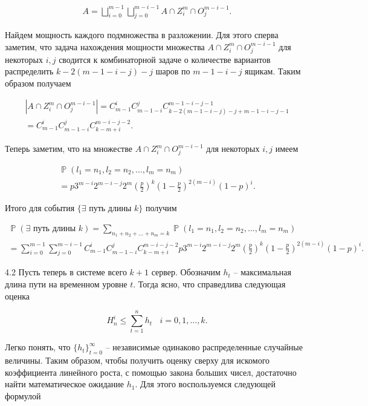 \documentclass[10pt, reqno]{amsart}
\DeclareMathOperator*{\Pb}{\mathbb{P}}
\begin{document}
  \begin{align*}
    A = \bigsqcup_{i=0}^{m-1}\bigsqcup_{j=0}^{m-i-1}A \cap Z_{i}^{m} \cap O_{j}^{m-i-1}.
  \end{align*}
  
  Найдем мощность каждого подмножества в разложении. Для этого сперва заметим, что задача нахождения мощности множества $A \cap Z_{i}^{m} \cap O_{j}^{m-i-1}$ для некоторых $i, j$ сводится к комбинаторной задаче о количестве вариантов распределить $k-2(m-1-i-j)-j$ шаров по $m-1-i-j$ ящикам. Таким образом получаем
  
  \begin{align*}
    |A \cap Z_{i}^{m} \cap O_{j}^{m-i-1}| = C_{m-1}^{i}C_{m-1-i}^{j}C_{k-2(m-1-i-j)-j+m-1-i-j-1}^{m-1-i-j-1} \\ = C_{m-1}^{i}C_{m-1-i}^{j}C_{k-m+i}^{m-i-j-2}.
  \end{align*}
  
  Теперь заметим, что на множестве $A \cap Z_{i}^{m} \cap O_{j}^{m-i-1}$ для некоторых $i, j$ имеем
  
  \begin{align*}
    \Pb(l_{1}=n_{1}, l_{2}=n_{2},..., l_{m}=n_{m}) \\ = p3^{m-i}2^{m-i-j}2^{m}(\frac{p}{2})^{k}(1-\frac{p}{2})^{2(m-i)}(1-p)^{i}.
  \end{align*}
  
  Итого для события $\{\exists \text{ путь длины } k\}$ получим
  
  \begin{align*}
    \Pb(\exists \text{ путь длины } k) = \sum_{n_{1}+n_{2}+...+n_{m} = k}\Pb(l_{1}=n_{1}, l_{2}=n_{2},..., l_{m}=n_{m}) \\ = \sum_{i=0}^{m-1}\sum_{j=0}^{m-i-1}C_{m-1}^{i}C_{m-1-i}^{j}C_{k-m+i}^{m-i-j-2}p3^{m-i}2^{m-i-j}2^{m}(\frac{p}{2})^{k}(1-\frac{p}{2})^{2(m-i)}(1-p)^{i}.
  \end{align*}
  
  4.2 Пусть теперь в системе всего $k+1$ сервер. Обозначим $h_{t}$ -- максимальная длина пути на временном уровне $t$. Тогда ясно, что справедлива следующая оценка
  
  \begin{equation}
      H_{n}^{i} \leq \sum_{t=1}^{n}h_{t} \:\:\:\: i=0,1,...,k.
  \end{equation}
  
  Легко понять, что $\{h_{t}\}_{t=0}^{\infty}$ -- независимые одинаково распределенные случайные величины. Таким образом, чтобы получить оценку сверху для искомого коэффициента линейного роста, с помощью закона больших чисел, достаточно найти математическое ожидание $h_{1}$. Для этого воспользуемся следующей формулой
  
\end{document}
